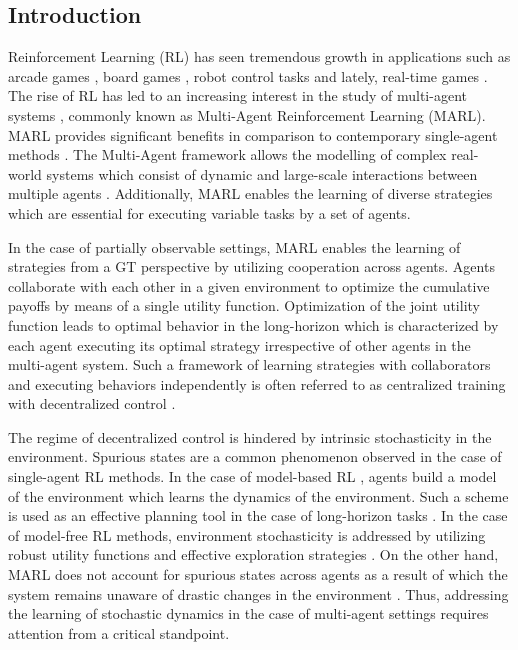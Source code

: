 \documentclass{article}
\begin{document}
\begin{multicols}{2}

\section{Introduction}
Reinforcement Learning (RL) has seen tremendous growth in applications such as arcade games \cite{atari}, board games \cite{go, shogi}, robot control tasks \cite{ddpg, ppo} and lately, real-time games \cite{SC2}. The rise of RL has led to an increasing interest in the study of multi-agent systems \cite{maddpg, alphastar}, commonly known as Multi-Agent Reinforcement Learning (MARL). MARL provides significant benefits in comparison to contemporary single-agent methods \cite{rl}. The Multi-Agent framework allows the modelling of complex real-world systems which consist of dynamic and large-scale interactions between multiple agents \cite{ltc}. Additionally, MARL enables the learning of diverse strategies which are essential for executing variable tasks by a set of agents.

In the case of partially observable settings, MARL enables the learning of strategies from a GT perspective by utilizing cooperation across agents\cite{cooperative}. Agents collaborate with each other in a given environment to optimize the cumulative payoffs by means of a single utility function. Optimization of the joint utility function leads to optimal behavior \cite{gt,selective} in the long-horizon which is characterized by each agent executing its optimal strategy irrespective of other agents in the multi-agent system. Such a framework of learning strategies with collaborators and executing behaviors independently is often referred to as centralized training with decentralized control \cite{coma}.

The regime of decentralized control is hindered by intrinsic stochasticity in the environment. Spurious states are a common phenomenon observed in the case of single-agent RL methods. In the case of model-based RL \cite{mbrl}, agents build a model of the environment which learns the dynamics of the environment. Such a scheme is used as an effective planning tool in the case of long-horizon tasks \cite{smirl}. In the case of model-free RL methods, environment stochasticity is addressed by utilizing robust utility functions \cite{surprise,surpmodeling} and effective exploration strategies \cite{gen}. On the other hand, MARL does not account for spurious states across agents as a result of which the system remains unaware of drastic changes in the environment \cite{role}. Thus, addressing the learning of stochastic dynamics in the case of multi-agent settings requires attention from a critical standpoint.


\end{multicols}
\end{document}
